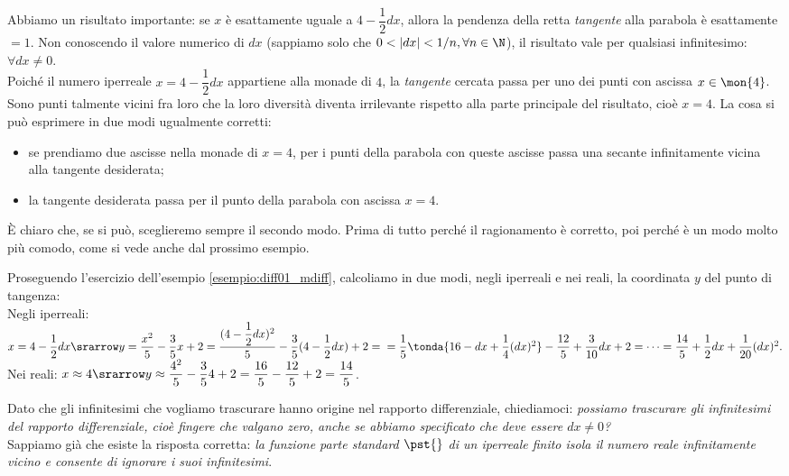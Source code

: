 Abbiamo un risultato importante: se $x$ è esattamente uguale a 
$4-\dfrac{1}{2}dx$, allora la pendenza della retta \emph{tangente} alla
parabola è esattamente $=1$. Non conoscendo il valore numerico di $dx$
(sappiamo solo che $0<|dx|<1/n, \forall n \in \N$), il risultato vale
per qualsiasi infinitesimo: $\forall dx \ne 0$.\\
Poiché il numero iperreale $x=4-\dfrac{1}{2}dx$ appartiene alla monade di $4$,
la \emph{tangente} cercata passa per uno dei punti con ascissa $x \in \mon{4}$.
Sono punti talmente vicini fra loro che la loro diversità diventa irrilevante
rispetto alla parte principale del risultato, cioè $x=4$. La cosa si può 
esprimere
in due modi ugualmente corretti:
\begin{itemize}[nosep, noitemsep]
 \item se prendiamo due ascisse nella monade di $x=4$, per i punti della 
parabola 
con queste ascisse passa una secante infinitamente vicina alla tangente 
desiderata;
\item la tangente desiderata passa per il punto della parabola con ascissa 
$x=4$.
\end{itemize}
È chiaro che, se si può, sceglieremo sempre il secondo modo. Prima di tutto 
perché il ragionamento è corretto, poi perché è un modo molto più comodo, come 
si vede anche dal prossimo esempio.
\begin{esempio}
 Proseguendo l'esercizio dell'esempio \ref{esempio:diff01_mdiff}, calcoliamo 
 in due modi, negli iperreali e nei reali, la coordinata $y$ del punto di 
 tangenza:\\
 Negli iperreali: $x=4-\dfrac{1}{2}dx\srarrow y=\dfrac{x^2}{5}-\dfrac{3}{5}x+2=
 \dfrac{(4-\dfrac{1}{2}dx)^2}{5}-\dfrac{3}{5}(4-\dfrac{1}{2}dx)+2=\\
 =\dfrac{1}{5}\tonda{16-dx+\dfrac{1}{4}(dx)^2}-\dfrac{12}{5}+\dfrac{3}{10}dx+2=
 \cdots= \dfrac{14}{5}+\dfrac{1}{2}dx+\dfrac{1}{20}(dx)^2.$\\
 Nei reali: $x\approx 4\srarrow 
 y\approx\dfrac{4^2}{5}-\dfrac{3}{5}4+2=
 \dfrac{16}{5}-\dfrac{12}{5}+2=\dfrac{14}{5}$.\\
\end{esempio}

Dato che gli infinitesimi che vogliamo trascurare hanno origine nel 
rapporto differenziale, chiediamoci: 
\emph{possiamo trascurare gli infinitesimi del rapporto differenziale,
cioè fingere che valgano zero, anche se abbiamo specificato che deve essere 
$dx \ne 0$?}\\
Sappiamo già che esiste la risposta corretta: \emph{la funzione parte standard 
$\pst{}$ di un iperreale finito isola il numero reale infinitamente vicino
e consente di ignorare i suoi infinitesimi}.

